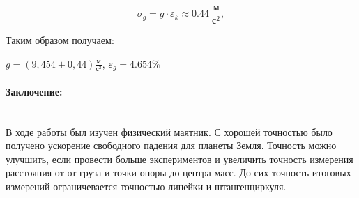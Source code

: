 \documentclass[a4paper, 12pt]{article}
\newcommand{\parag}[1]{\paragraph*{#1:}}
\begin{document}
\begin{equation}
    \sigma_g = g\cdot\varepsilon_k \approx 0.44 ~ \frac{\text{м}}{\text{с}^2},
\end{equation}

Таким образом получаем:

$g = (9,454 \pm 0,44 ) \frac{\text{м}}{\text{с}^2} $, $ \varepsilon_g=4.654\% $

\parag {Заключение} ~\\
В ходе работы был изучен физический маятник. С хорошей точностью было получено ускорение свободного падения для планеты Земля. Точность можно улучшить, если провести больше экспериментов и увеличить точность измерения расстояния от от груза и точки опоры до центра масс. До сих точность итоговых измерений ограничевается точностью линейки и штангенциркуля. 
\end{document}
